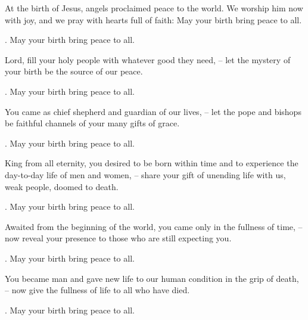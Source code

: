 \lettrine[loversize=0.15,lines=2]{A}{}t the birth of Jesus, angels proclaimed peace to the world. We worship him now with joy, and we pray with hearts full of faith: May your birth bring peace to all.
\par \Rbar. May your birth bring peace to all.

Lord, fill your holy people with whatever good they need,
– let the mystery of your birth be the source of our peace.
\par \Rbar. May your birth bring peace to all.

You came as chief shepherd and guardian of our lives,
– let the pope and bishops be faithful channels of your many gifts of grace.
\par \Rbar. May your birth bring peace to all.

King from all eternity, you desired to be born within time and to experience the day-to-day life of men and women,
– share your gift of unending life with us, weak people, doomed to death.
\par \Rbar. May your birth bring peace to all.

Awaited from the beginning of the world, you came only in the fullness of time,
– now reveal your presence to those who are still expecting you.
\par \Rbar. May your birth bring peace to all.

You became man and gave new life to our human condition in the grip of death,
– now give the fullness of life to all who have died.
\par \Rbar. May your birth bring peace to all.
